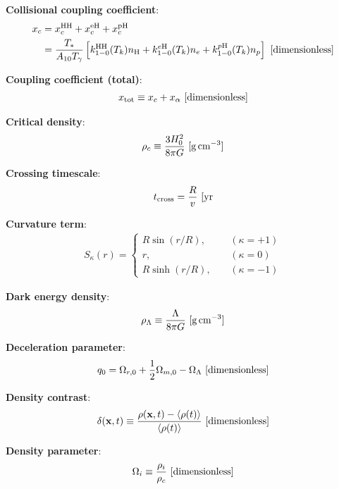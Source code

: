 \documentclass[a4paper,11pt]{article}
\begin{document}
{\noindent}\textbf{Collisional coupling coefficient}:
\begin{align*}
    x_c &= x_c^\mathrm{HH} + x_c^\mathrm{eH} + x_c^\mathrm{pH} \\
        &= \frac{T_*}{A_{10}T_\gamma} \left[k_{1-0}^\mathrm{HH}(T_k)n_\mathrm{H}+k_{1-0}^{e\mathrm{H}}(T_k)n_e+k_{1-0}^{p\mathrm{H}}(T_k)n_p\right] ~ [{\rm dimensionless}]
\end{align*}

{\noindent}\textbf{Coupling coefficient (total)}:
\begin{align*}
    x_\mathrm{tot} \equiv x_c + x_\alpha ~ [{\rm dimensionless}]
\end{align*}

{\noindent}\textbf{Critical density}:
\begin{align*}
    \rho_c \equiv \dfrac{3H_0^2}{8\pi G}  ~ [{\rm g\,cm^{-3}}]
\end{align*}

{\noindent}\textbf{Crossing timescale}:
\begin{align*}
    t_\mathrm{cross} = \frac{R}{v} ~ [{\rm yr}
\end{align*}

{\noindent}\textbf{Curvature term}:
\begin{align*}
S_\kappa(r) =
\left\{
\begin{aligned}
R\sin(r/R), ~~~~~& (\kappa = +1) \\
          r,~~~~~& (\kappa = 0) \\
R\sinh(r/R),~~~~~& (\kappa = -1)
\end{aligned}
\right.
\end{align*}

{\noindent}\textbf{Dark energy density}:
\begin{align*}
    \rho_\Lambda \equiv \dfrac{\Lambda}{8\pi G} ~ [{\rm g\,cm^{-3}}]
\end{align*}

{\noindent}\textbf{Deceleration parameter}:
\begin{align*}
    q_0 = \Omega_{r,0} + \frac{1}{2}\Omega_{m,0} - \Omega_\Lambda ~ [{\rm dimensionless}]
\end{align*}

{\noindent}\textbf{Density contrast}:
\begin{align*}
    \delta(\mathbf{x},t) \equiv \frac{\rho(\mathbf{x},t)-\langle\rho(t)\rangle}{\langle\rho(t)\rangle} ~ [{\rm dimensionless}]
\end{align*}

{\noindent}\textbf{Density parameter}:
\begin{align*}
    \Omega_i \equiv \frac{\rho_i}{\rho_c} ~ [{\rm dimensionless}]
\end{align*}
\end{document}
